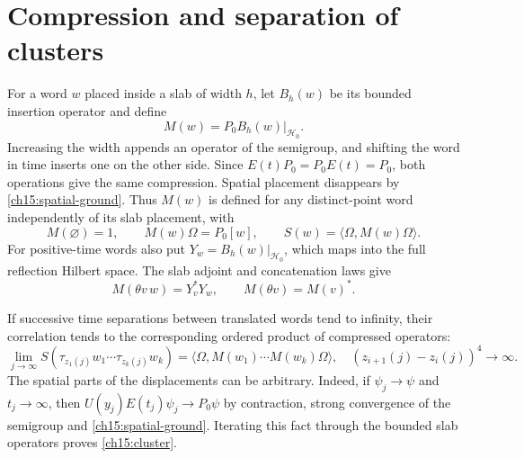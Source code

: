 \section{Compression and separation of clusters}
\label{ch15:compression}

For a word $w$ placed inside a slab of width $h$, let $B_h(w)$ be its
bounded insertion operator and define
\[
 M(w)=P_0B_h(w)|_{\mathcal H_0}.
\]
Increasing the width appends an operator of the semigroup, and shifting the word in
time inserts one on the other side. Since $E(t)P_0=P_0E(t)=P_0$, both operations give the same compression.
Spatial placement disappears by \eqref{ch15:spatial-ground}. Thus
$M(w)$ is defined for any distinct-point word independently of its
slab placement, with
\[
 M(\varnothing)=1,\qquad M(w)\Omega=P_0[w],\qquad
                  S(w)=\langle\Omega,M(w)\Omega\rangle.
\]
For positive-time words also put $Y_w=B_h(w)|_{\mathcal H_0}$,
which maps into the full reflection Hilbert space. The slab adjoint
and concatenation laws give
\begin{equation}
 M(\theta v\,w)=Y_v^*Y_w,
 \qquad M(\theta v)=M(v)^*.
 \label{ch15:whole-gram}
\end{equation}

If successive time separations between translated words tend to infinity,
their correlation tends to the corresponding ordered product of
compressed operators:
\begin{equation}
 \lim_{j\to\infty}S(\tau_{z_1(j)}w_1\cdots\tau_{z_k(j)}w_k)
       =\langle\Omega,M(w_1)\cdots M(w_k)\Omega\rangle,
 \quad (z_{i+1}(j)-z_i(j))^4\to\infty.
 \label{ch15:cluster}
\end{equation}
The spatial parts of the displacements can be arbitrary. Indeed,
if $\psi_j\to\psi$ and $t_j\to\infty$, then
$U(y_j)E(t_j)\psi_j\to P_0\psi$ by contraction, strong
convergence of the semigroup and \eqref{ch15:spatial-ground}. Iterating this fact through
the bounded slab operators proves \eqref{ch15:cluster}.

